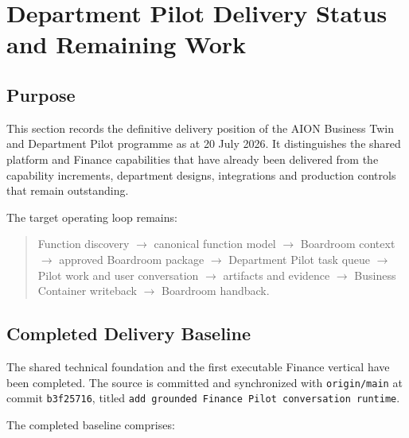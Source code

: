 \section{Department Pilot Delivery Status and Remaining Work}
\label{sec:department-pilot-remaining-delivery-plan}

\subsection{Purpose}

This section records the definitive delivery position of the AION Business Twin and
Department Pilot programme as at 20 July 2026.  It distinguishes the shared platform
and Finance capabilities that have already been delivered from the capability increments,
department designs, integrations and production controls that remain outstanding.

The target operating loop remains:

\begin{quote}
Function discovery $\rightarrow$ canonical function model $\rightarrow$ Boardroom context
$\rightarrow$ approved Boardroom package $\rightarrow$ Department Pilot task queue
$\rightarrow$ Pilot work and user conversation $\rightarrow$ artifacts and evidence
$\rightarrow$ Business Container writeback $\rightarrow$ Boardroom handback.
\end{quote}

\subsection{Completed Delivery Baseline}

The shared technical foundation and the first executable Finance vertical have been
completed.  The source is committed and synchronized with \texttt{origin/main} at commit
\texttt{b3f25716}, titled \texttt{add grounded Finance Pilot conversation runtime}.

The completed baseline comprises:

